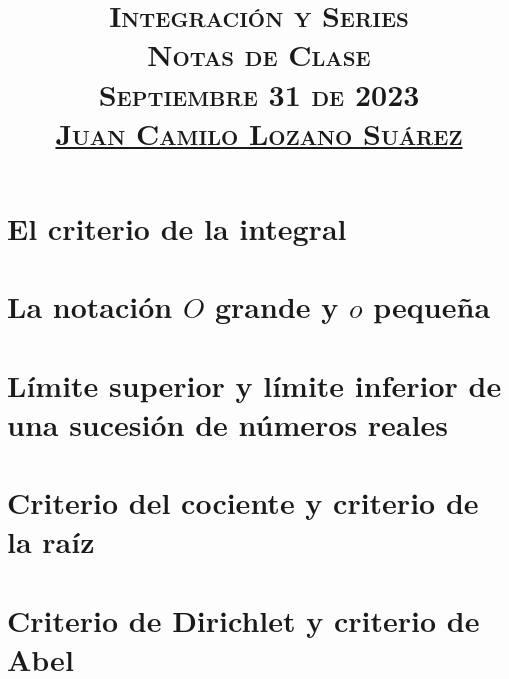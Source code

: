 \documentclass[letterpaper]{article} %
\title{
  \vspace{-1.5cm}
  \textsc{
    \Large{Integración y Series\\ Notas de Clase}\\ \vspace{0.2cm}
    \large{Septiembre 31 de 2023\\ \vspace{1cm} \underline{Juan Camilo Lozano Suárez}}\\
  }
}
\date{}
\begin{document}
  \maketitle
  \section{El criterio de la integral}
    
    
    
  \section{La notación $O$ grande y $o$ pequeña}
    
  \section{Límite superior y límite inferior de una sucesión de números reales}
    
  \section{Criterio del cociente y criterio de la raíz}
    
    
    
  \section{Criterio de Dirichlet y criterio de Abel}
    
    
    
\end{document}
